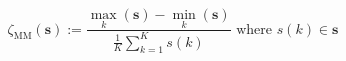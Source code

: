 \begin{equation}
	\zeta_\text{MM}(\textbf{s}) := \frac{\max_k\left(\textbf{s}\right) - \min_k\left(\textbf{s}\right)}{\frac{1}{K}\sum_{k=1}^{K}s(k)}
	\text{ where } s(k) \in \textbf{s}
\label{ch1:equ:min-max-difference-definition}
\end{equation}